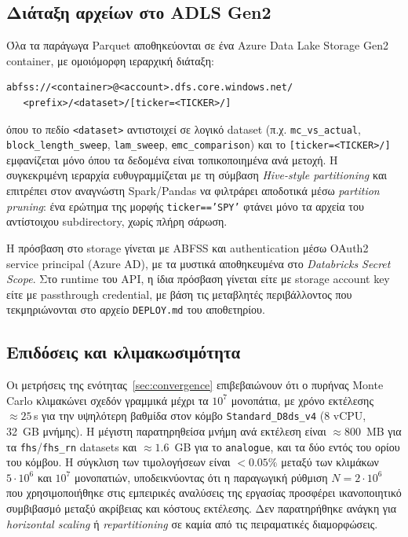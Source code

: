 \documentclass[12pt]{article}
\begin{document}
\subsection{Διάταξη αρχείων στο ADLS Gen2}
Όλα τα παράγωγα Parquet αποθηκεύονται σε ένα Azure Data Lake Storage Gen2 container, με ομοιόμορφη ιεραρχική διάταξη:
\begin{verbatim}
abfss://<container>@<account>.dfs.core.windows.net/
   <prefix>/<dataset>/[ticker=<TICKER>/]
\end{verbatim}
όπου το πεδίο \texttt{<dataset>} αντιστοιχεί σε λογικό dataset (π.χ. \texttt{mc\_vs\_actual}, \texttt{block\_length\_sweep}, \texttt{lam\_sweep}, \texttt{emc\_comparison}) και το \texttt{[ticker=<TICKER>/]} εμφανίζεται μόνο όπου τα δεδομένα είναι τοπικοποιημένα ανά μετοχή. Η συγκεκριμένη ιεραρχία ευθυγραμμίζεται με τη σύμβαση \emph{Hive-style partitioning} και επιτρέπει στον αναγνώστη Spark/Pandas να φιλτράρει αποδοτικά μέσω \emph{partition pruning}: ένα ερώτημα της μορφής \texttt{ticker=='SPY'} φτάνει μόνο τα αρχεία του αντίστοιχου subdirectory, χωρίς πλήρη σάρωση.

Η πρόσβαση στο storage γίνεται με ABFSS και authentication μέσω OAuth2 service principal (Azure AD), με τα μυστικά αποθηκευμένα στο \emph{Databricks Secret Scope}. Στο runtime του API, η ίδια πρόσβαση γίνεται είτε με storage account key είτε με passthrough credential, με βάση τις μεταβλητές περιβάλλοντος που τεκμηριώνονται στο αρχείο \texttt{DEPLOY.md} του αποθετηρίου.

\subsection{Επιδόσεις και κλιμακωσιμότητα}
Οι μετρήσεις της ενότητας~\ref{sec:convergence} επιβεβαιώνουν ότι ο πυρήνας Monte Carlo κλιμακώνει σχεδόν γραμμικά μέχρι τα $10^7$ μονοπάτια, με χρόνο εκτέλεσης $\approx 25\,$s για την υψηλότερη βαθμίδα στον κόμβο \texttt{Standard\_D8ds\_v4} (8 vCPU, 32~GB μνήμης). Η μέγιστη παρατηρηθείσα μνήμη ανά εκτέλεση είναι $\approx 800$~MB για τα \texttt{fhs}/\texttt{fhs\_rn} datasets και $\approx 1.6$~GB για το \texttt{analogue}, και τα δύο εντός του ορίου του κόμβου. Η σύγκλιση των τιμολογήσεων είναι $< 0.05\%$ μεταξύ των κλιμάκων $5\cdot 10^6$ και $10^7$ μονοπατιών, υποδεικνύοντας ότι η παραγωγική ρύθμιση $N = 2\cdot 10^6$ που χρησιμοποιήθηκε στις εμπειρικές αναλύσεις της εργασίας προσφέρει ικανοποιητικό συμβιβασμό μεταξύ ακρίβειας και κόστους εκτέλεσης. Δεν παρατηρήθηκε ανάγκη για \emph{horizontal scaling} ή \emph{repartitioning} σε καμία από τις πειραματικές διαμορφώσεις.
\end{document}
